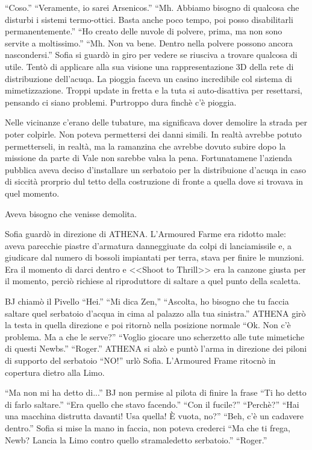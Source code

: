     ``Coso.'' ``Veramente, io sarei Arsenicos.'' ``Mh. Abbiamo bisogno di qualcosa che disturbi i sistemi termo-ottici.
    Basta anche poco tempo, poi posso disabilitarli permanentemente.'' ``Ho creato delle nuvole di polvere, prima, ma
    non sono servite a moltissimo.'' ``Mh. Non va bene. Dentro nella polvere possono ancora nascondersi.'' Sofia si
    guardò in giro per vedere se riusciva a trovare qualcosa di utile. Tentò di applicare alla sua visione una
    rappresentazione 3D della rete di distribuzione dell'acuqa. La pioggia faceva un casino incredibile col sistema di
    mimetizzazione. Troppi update in fretta e la tuta si auto-disattiva per resettarsi, pensando ci siano problemi.
    Purtroppo dura finchè c'è pioggia.

    Nelle vicinanze c'erano delle tubature, ma significava dover demolire la strada per poter colpirle. Non poteva
    permettersi dei danni simili. In realtà avrebbe potuto permetterseli, in realtà, ma la ramanzina che avrebbe dovuto
    subire dopo la missione da parte di Vale non sarebbe valsa la pena. Fortunatamene l'azienda pubblica aveva deciso
    d'installare un serbatoio per la distribuione d'acuqa in caso di siccità prorprio dul tetto della costruzione di
    fronte a quella dove si trovava in quel momento.

    Aveva bisogno che venisse demolita.

    Sofia guardò in direzione di ATHENA. L'Armoured Farme era ridotto male: aveva parecchie piastre d'armatura
    danneggiuate da colpi di lanciamissile e, a giudicare dal numero di bossoli impiantati per terra, stava per finire
    le munzioni. Era il momento di darci dentro e <<Shoot to Thrill>> era la canzone giusta per il momento, perciò
    richiese al riproduttore di saltare a quel punto della scaletta.

    BJ chiamò il Pivello ``Hei.'' ``Mi dica Zen,'' ``Ascolta, ho bisogno che tu faccia saltare quel serbatoio d'acqua in
    cima al palazzo alla tua sinistra.'' ATHENA girò la testa in quella direzione e poi ritornò nella posizione normale
    ``Ok. Non c'è problema. Ma a che le serve?'' ``Voglio giocare uno scherzetto alle tute mimetiche di questi Newbs.''
    ``Roger.'' ATHENA si alzò e puntò l'arma in direzione dei piloni di supporto del serbatoio ``NO!'' urlò Sofia.
    L'Armoured Frame ritocnò in copertura dietro alla Limo.

    ``Ma non mi ha detto di...'' BJ non permise al pilota di finire la frase  ``Ti ho detto di farlo saltare.'' ``Era
    quello che stavo facendo.'' ``Con il fucile?'' ``Perchè?'' ``Hai una macchina distrutta davanti! Usa quella! È
    vuota, no?'' ``Beh, c'è un cadavere dentro.'' Sofia si mise la mano in faccia, non poteva crederci ``Ma che ti frega, Newb? Lancia la
    Limo contro quello stramaledetto serbatoio.'' ``Roger.''

